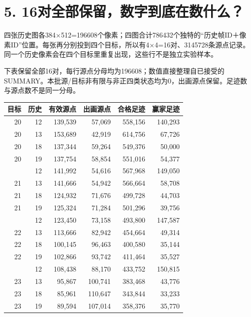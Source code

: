 \documentclass[UTF8,11pt,a4paper]{ctexart}
\begin{document}
\clearpage

\section*{5. 16对全部保留，数字到底在数什么？}

四张历史图各384×512=196608个像素；四图合计786432个独特的“历史帧ID＋像素ID”位置。每张再分别投到四个目标，所以有4×4=16对、3145728条源点记录。同一个历史像素会在四个目标里重复出现，这些行不是独立实验样本。
\par


下表保留全部16对，每行源点分母均为196608；数值直接整理自已接受的SUMMARY。本批源/目标非有限与非正四类状态均为0，出画源点保留。足迹数与源点数不是同一分母。
\par


\begin{center}\small\begin{tabular}{rrrrrr}\toprule
目标&历史&有效源点&出画源点&合格足迹&赢家足迹\\\midrule
20 & 12 & 139,539 & 57,069 & 558,156 & 140,293\\
20 & 13 & 153,689 & 42,919 & 614,756 & 67,726\\
20 & 18 & 137,344 & 59,264 & 549,376 & 50,000\\
20 & 19 & 137,754 & 58,854 & 551,016 & 54,377\\
\addlinespace[.3em]
21 & 12 & 141,992 & 54,616 & 567,968 & 149,050\\
21 & 13 & 141,666 & 54,942 & 566,664 & 58,708\\
21 & 18 & 124,932 & 71,676 & 499,728 & 44,703\\
21 & 19 & 125,324 & 71,284 & 501,296 & 39,756\\
\addlinespace[.3em]
22 & 12 & 123,450 & 73,158 & 493,800 & 147,587\\
22 & 13 & 113,666 & 82,942 & 454,664 & 49,314\\
22 & 18 & 100,145 & 96,463 & 400,580 & 35,144\\
22 & 19 & 102,866 & 93,742 & 411,464 & 35,527\\
\addlinespace[.3em]
23 & 12 & 108,438 & 88,170 & 433,752 & 150,815\\
23 & 13 & 95,867 & 100,741 & 383,468 & 43,776\\
23 & 18 & 85,961 & 110,647 & 343,844 & 33,233\\
23 & 19 & 89,594 & 107,014 & 358,376 & 35,770\\
\bottomrule\end{tabular}\end{center}
\end{document}

